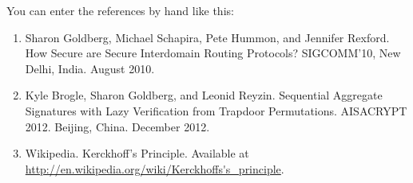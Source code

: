 \documentclass[11pt]{article}
\theoremstyle{definition}
\begin{document}
You can enter the references by hand like this:
\begin{enumerate}
\item Sharon Goldberg, Michael Schapira, Pete Hummon, and Jennifer Rexford. How Secure are Secure Interdomain Routing Protocols? SIGCOMM'10, New Delhi, India. August 2010.

\item Kyle Brogle, Sharon Goldberg, and Leonid Reyzin. Sequential Aggregate Signatures with Lazy Verification from Trapdoor Permutations. AISACRYPT 2012. Beijing, China. December 2012.
    
\item Wikipedia. Kerckhoff's Principle. Available at \url{http://en.wikipedia.org/wiki/Kerckhoffs's_principle}.
\end{enumerate}
\end{document}
